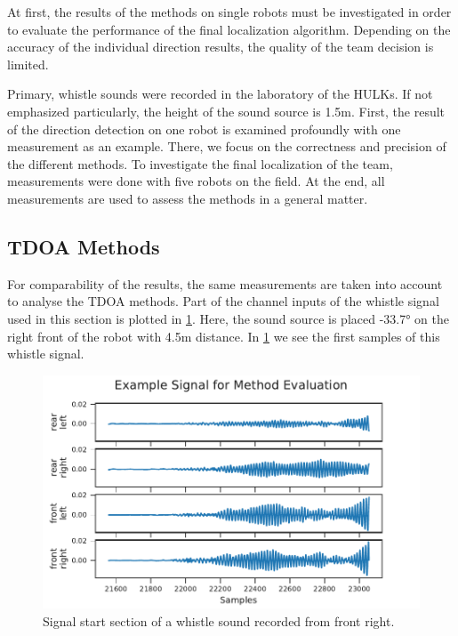 At first, the results of the methods on single robots must be investigated
in order to evaluate the performance of the final localization algorithm.
Depending on the accuracy of the individual direction results, the quality
of the team decision is limited.

Primary, whistle sounds were recorded in the laboratory of the HULKs.
If not emphasized particularly, the height of the sound source is 1.5\si{m}.
First, the result of the direction detection on one robot
is examined profoundly with one measurement as an example.
There, we focus on the correctness and precision of the different methods.
To investigate the final localization of the team, measurements were
done with five robots on the field.
At the end, all measurements are used to assess the methods in a general matter.

\subsection{\ac{TDOA} Methods}

For comparability of the results, the same measurements are taken into
account to analyse the \ac{TDOA} methods.
Part of the channel inputs of the whistle signal used in this section is plotted
in \ref{fig:04_tdoaSignal}.
Here, the sound source is placed -33.7\si{\degree} on the right front
of the robot with 4.5\si{m} distance.
In \cref{fig:04_tdoaSignal} we see the first samples of this whistle signal.
\begin{figure}[ht]
	\centering
		\includegraphics[]{figures/evaluation/cc_frontRight_1_signal}
	\caption{Signal start section of a whistle sound recorded from front right.}
	\label{fig:04_tdoaSignal}
\end{figure}

